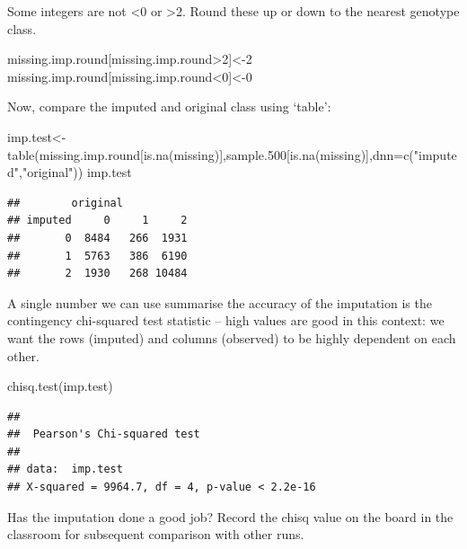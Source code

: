 \documentclass[
]{book}
\newenvironment{Shaded}{\begin{snugshade}}{\end{snugshade}}
\newcommand{\AttributeTok}[1]{\textcolor[rgb]{0.77,0.63,0.00}{#1}}
\newcommand{\DecValTok}[1]{\textcolor[rgb]{0.00,0.00,0.81}{#1}}
\newcommand{\FloatTok}[1]{\textcolor[rgb]{0.00,0.00,0.81}{#1}}
\newcommand{\FunctionTok}[1]{\textcolor[rgb]{0.00,0.00,0.00}{#1}}
\newcommand{\NormalTok}[1]{#1}
\newcommand{\OtherTok}[1]{\textcolor[rgb]{0.56,0.35,0.01}{#1}}
\newcommand{\SpecialCharTok}[1]{\textcolor[rgb]{0.00,0.00,0.00}{#1}}
\newcommand{\StringTok}[1]{\textcolor[rgb]{0.31,0.60,0.02}{#1}}
\begin{document}
Some integers are not \textless0 or \textgreater2. Round these up or down to the nearest genotype class.

\begin{Shaded}
\begin{Highlighting}[]
\NormalTok{missing.imp.round[missing.imp.round}\SpecialCharTok{\textgreater{}}\DecValTok{2}\NormalTok{]}\OtherTok{\textless{}{-}}\DecValTok{2}
\NormalTok{missing.imp.round[missing.imp.round}\SpecialCharTok{\textless{}}\DecValTok{0}\NormalTok{]}\OtherTok{\textless{}{-}}\DecValTok{0}
\end{Highlighting}
\end{Shaded}

Now, compare the imputed and original class using `table':

\begin{Shaded}
\begin{Highlighting}[]
\NormalTok{imp.test}\OtherTok{\textless{}{-}}\FunctionTok{table}\NormalTok{(missing.imp.round[}\FunctionTok{is.na}\NormalTok{(missing)],sample}\FloatTok{.500}\NormalTok{[}\FunctionTok{is.na}\NormalTok{(missing)],}\AttributeTok{dnn=}\FunctionTok{c}\NormalTok{(}\StringTok{"imputed"}\NormalTok{,}\StringTok{"original"}\NormalTok{))}
\NormalTok{imp.test}
\end{Highlighting}
\end{Shaded}

\begin{verbatim}
##        original
## imputed     0     1     2
##       0  8484   266  1931
##       1  5763   386  6190
##       2  1930   268 10484
\end{verbatim}

A single number we can use summarise the accuracy of the imputation is the contingency chi-squared test statistic -- high values are good in this context: we want the rows (imputed) and columns (observed) to be highly dependent on each other.

\begin{Shaded}
\begin{Highlighting}[]
\FunctionTok{chisq.test}\NormalTok{(imp.test) }
\end{Highlighting}
\end{Shaded}

\begin{verbatim}
## 
##  Pearson's Chi-squared test
## 
## data:  imp.test
## X-squared = 9964.7, df = 4, p-value < 2.2e-16
\end{verbatim}

Has the imputation done a good job? Record the chisq value on the board in the classroom for subsequent comparison with other runs.
\end{document}
